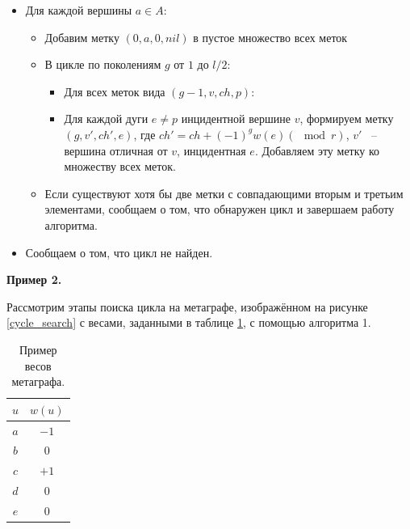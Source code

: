 \documentclass[14pt]{mmcs-article}
\begin{document}
\begin{itemize}

\item Для каждой вершины $a \in A:$

\begin{itemize}
    \item Добавим метку $(0, a, 0, nil)$ в пустое множество всех меток
    \item В цикле по поколениям $g$ от $1$ до $l / 2$:
    \begin{itemize}
        \item Для всех меток вида $(g - 1, v, ch, p)$:
        \item
            Для каждой дуги $e \not= p$ инцидентной вершине $v$,
            формируем метку $(g, v', ch', e)$, где $ch' = ch + (-1)^{g} w(e) (\mod{r})$, $v'$ ~-- вершина отличная от $v$, инцидентная $e$.
            Добавляем эту метку ко множеству всех меток.
    \end{itemize}
    \item Если существуют хотя бы две метки с совпадающими вторым и третьим элементами, сообщаем о том, что обнаружен цикл и завершаем работу алгоритма.
\end{itemize}

\item Сообщаем о том, что цикл не найден.
\end{itemize}

\textbf{Пример 2.}


Рассмотрим этапы поиска цикла на метаграфе, изображённом на рисунке \ref{cycle_search} с весами, заданными в таблице \ref{cycle_search_graph_table}, с помощью алгоритма 1. 

\begin{table}[H]
    \centering
    \begin{tabular}{ | c | c | }
        \hline
        $u$ & $w(u)$ \\ \hline
        $a$ & $-1$   \\
        $b$ & $0$    \\
        $c$ & $+1$   \\
        $d$ & $0$    \\
        $e$ & $0$    \\ \hline
    \end{tabular}
    \caption{ Пример весов метаграфа. }\label{cycle_search_graph_table}
\end{table}
\end{document}
